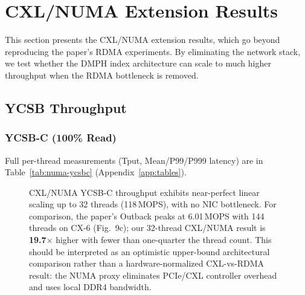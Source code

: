 \documentclass[conference]{IEEEtran}
\begin{document}
\section{CXL/NUMA Extension Results}\label{sec:cxl-results}

This section presents the CXL/NUMA extension results, which go beyond reproducing the paper's RDMA experiments. By eliminating the network stack, we test whether the DMPH index architecture can scale to much higher throughput when the RDMA bottleneck is removed.

\subsection{YCSB Throughput}

\subsubsection{YCSB-C (100\% Read)}

Full per-thread measurements (Tput, Mean/P99/P999 latency) are in Table~\ref{tab:numa-ycsbc} (Appendix~\ref{app:tables}).
\begin{figure}[H]
\centering
{}
\caption{CXL/NUMA YCSB-C throughput exhibits near-perfect linear scaling up to 32 threads (118\,MOPS), with no NIC bottleneck. For comparison, the paper's Outback peaks at 6.01\,MOPS with 144 threads on CX-6 (Fig.~9c); our 32-thread CXL/NUMA result is \textbf{19.7$\times$} higher with fewer than one-quarter the thread count. This should be interpreted as an optimistic upper-bound architectural comparison rather than a hardware-normalized CXL-vs-RDMA result: the NUMA proxy eliminates PCIe/CXL controller overhead and uses local DDR4 bandwidth.}
\label{fig:numa-ycsbc-bar}
\end{figure}
\end{document}
